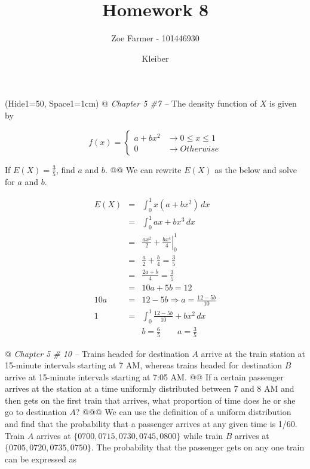 \documentclass[10pt]{article}
\title{Homework 8}
\date{Kleiber}
\author{Zoe Farmer - 101446930}
\begin{document}
\maketitle

\begin{table}[!ht]
    \centering
\end{table}

\begin{easylist}[enumerate]
    \ListProperties(Hide1=50, Space1=1cm)
    @ \textit{Chapter 5 \#7 --} The density function of $X$ is given by

    \[
        f(x) =
        \begin{cases}
            a + b x^2 &\to 0 \le x \le 1\\
            0 &\to Otherwise
        \end{cases}
    \]

    If $E(X) = \frac{3}{5}$, find $a$ and $b$.
    @@ We can rewrite $E(X)$ as the below and solve for $a$ and $b$.

    \[
        \begin{aligned}
            E(X) &=& \int^1_0 x \left( a + b x^2 \right) \, dx\\
                 &=& \int^1_0 ax + b x^3  \, dx\\
                 &=& \left. \frac{ax^2}{2} + \frac{bx^4}{4} \right|^1_0\\
                 &=& \frac{a}{2} + \frac{b}{4} = \frac{3}{5}\\
                 &=& \frac{2a + b}{4} = \frac{3}{5}\\
                 &=& 10a + 5b = 12\\
             10a &=& 12 - 5b \Rightarrow a = \frac{12 - 5b}{10}\\
             1 &=& \int^1_0 \frac{12 - 5b}{10} + bx^2 \, dx\\
             && \boxed{b = \frac{6}{5} \qquad a = \frac{3}{5}}
        \end{aligned}
    \]

    @ \textit{Chapter 5 \# 10 --} Trains headed for destination $A$ arrive at the train station at 15-minute intervals
    starting at 7 AM, whereas trains headed for destination $B$ arrive at 15-minute intervals starting at 7:05 AM.
    @@ If a certain passenger arrives at the station at a time uniformly distributed between 7 and 8 AM and then gets on
    the first train that arrives, what proportion of time does he or she go to destination $A$?
    @@@ We can use the definition of a uniform distribution and find that the probability that a passenger arrives at
    any given time is 1/60. Train $A$ arrives at $\{0700, 0715, 0730, 0745, 0800\}$ while train $B$ arrives at
    $\{0705,0720,0735,0750\}$. The probability that the passenger gets on any one train can be expressed as


\end{easylist}
\end{document}
